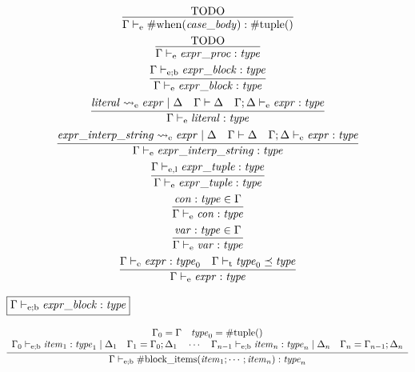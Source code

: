 \begin{gather*}
    \infer{\Gamma \vdash_\mathrm{e} \mathrm{\#when}(\mathit{case\_body}): \mathrm{\#tuple}()}{
        \text{TODO}
    }
    \\
    \infer{\Gamma \vdash_\mathrm{e} \mathit{expr\_proc}: \mathit{type}}{
        \text{TODO}
    }
    \\
    \infer{\Gamma \vdash_\mathrm{e} \mathit{expr\_block}: \mathit{type}}{
        \Gamma \vdash_{\mathrm{e}; \mathrm{b}} \mathit{expr\_block}: \mathit{type}
    }
    \\
    \infer{\Gamma \vdash_\mathrm{e} \mathit{literal}: \mathit{type}}{
        \mathit{literal} \rightsquigarrow_\mathrm{e} \mathit{expr} \mid \Delta
        &
        \Gamma \vdash \Delta
        &
        \Gamma; \Delta \vdash_\mathrm{e} \mathit{expr}: \mathit{type}
    }
    \\
    \infer{\Gamma \vdash_\mathrm{e} \mathit{expr\_interp\_string}: \mathit{type}}{
        \mathit{expr\_interp\_string} \rightsquigarrow_\mathrm{e} \mathit{expr} \mid \Delta
        &
        \Gamma \vdash \Delta
        &
        \Gamma; \Delta \vdash_\mathrm{e} \mathit{expr}: \mathit{type}
    }
    \\
    \infer{\Gamma \vdash_\mathrm{e} \mathit{expr\_tuple}: \mathit{type}}{
        \Gamma \vdash_{\mathrm{e}, \mathrm{l}} \mathit{expr\_tuple}: \mathit{type}
    }
    \\
    \infer{\Gamma \vdash_\mathrm{e} \mathit{con}: \mathit{type}}{
        \mathit{con}: \mathit{type} \in \Gamma
    }
    \\
    \infer{\Gamma \vdash_\mathrm{e} \mathit{var}: \mathit{type}}{
        \mathit{var}: \mathit{type} \in \Gamma
    }
    \\
    \infer{\Gamma \vdash_\mathrm{e} \mathit{expr}: \mathit{type}}{
        \Gamma \vdash_\mathrm{e} \mathit{expr}: \mathit{type}_0
        &
        \Gamma \vdash_\mathrm{t} \mathit{type}_0 \preceq \mathit{type}
    }
\end{gather*}

$\fbox{$\Gamma \vdash_{\mathrm{e}; \mathrm{b}} \mathit{expr\_block}: \mathit{type}$}$

\begin{gather*}
    \infer{\Gamma \vdash_{\mathrm{e}; \mathrm{b}} \mathrm{\#block\_items}(\mathit{item}_1; \cdots; \mathit{item}_n): \mathit{type}_n}{
        \begin{array}{c}
            \Gamma_0 = \Gamma
            \hspace{1em}
            \mathit{type}_0 = \mathrm{\#tuple}()
            \\
            \Gamma_0 \vdash_{\mathrm{e}; \mathrm{b}} \mathit{item}_1: \mathit{type}_1 \mid \Delta_1
            \hspace{1em}
            \Gamma_1 = \Gamma_0; \Delta_1
            \hspace{1em}
            \cdots
            \hspace{1em}
            \Gamma_{n - 1} \vdash_{\mathrm{e}; \mathrm{b}} \mathit{item}_n: \mathit{type}_n \mid \Delta_n
            \hspace{1em}
            \Gamma_n = \Gamma_{n - 1}; \Delta_n
        \end{array}
    }
\end{gather*}


